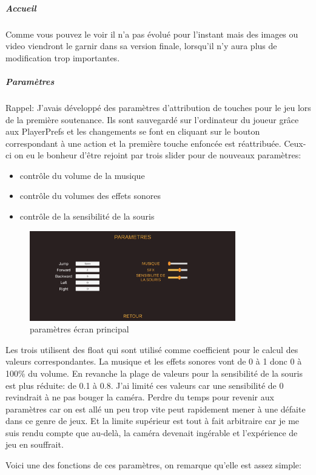 \documentclass{article}
\begin{document}
\subparagraph{Accueil}
Comme vous pouvez le voir il n'a pas évolué pour l'instant mais des images ou video viendront le garnir dans sa version finale, lorsqu'il n'y aura plus de modification trop importantes.
\subparagraph{Paramètres}
Rappel: J'avais développé des paramètres d'attribution de touches pour le jeu lors de la première soutenance. Ils sont sauvegardé sur l'ordinateur du joueur grâce aux PlayerPrefs et les changements se font en cliquant sur le bouton correspondant à une action et la première touche enfoncée est réattribuée.
Ceux-ci on eu le bonheur d'être rejoint par trois slider pour de nouveaux paramètres:

\begin{itemize}
    \item contrôle du volume de la musique
    \item contrôle du volumes des effets sonores
    \item contrôle de la sensibilité de la souris
\end{itemize}

\begin{figure}[!h]
    \centering
    \includegraphics[width=0.8\textwidth]{parametres.png}
    \caption{paramètres écran principal}
\end{figure}

Les trois utilisent des float qui sont utilisé comme coefficient pour le calcul des valeurs correspondantes. La musique et les effets sonores vont de 0 à 1 donc 0 à 100\% du volume. En revanche la plage de valeurs pour la sensibilité de la souris est plus réduite: de 0.1 à 0.8. J'ai limité ces valeurs car une sensibilité de 0 revindrait à ne pas bouger la caméra. Perdre du temps pour revenir aux paramètres car on est allé un peu trop vite peut rapidement mener à une défaite dans ce genre de jeux. Et la limite supérieur est tout à fait arbitraire car je me suis rendu compte que au-delà, la caméra devenait ingérable et l'expérience de jeu en souffrait.

\newpage

Voici une des fonctions de ces paramètres, on remarque qu'elle est assez simple:
\end{document}
